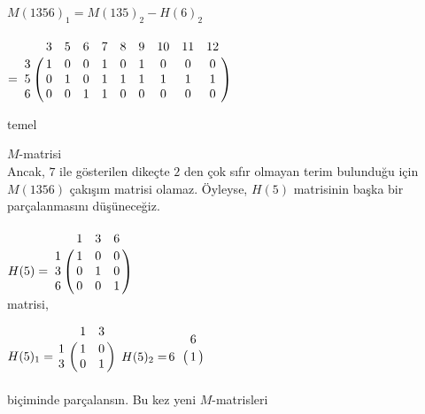 \documentclass{article}
\begin{document}
$M(1356)_{1} = M(135)_{2} - H(6)_{2}$  \\
\\

\hspace{15mm}
$ =  \bordermatrix {~ & 3 & 5 & 6 & 7 & 8 & 9 & 10 & 11 & 12  \cr 
                       3 & 1 & 0 & 0 & 1 & 0 & 1 & 0 & 0 & 0 \cr 
                       5 & 0 & 1 & 0 & 1 & 1 & 1 & 1 & 1 & 1 \cr
                       6 & 0 & 0 & 1 & 1 & 0 & 0 & 0 & 0 & 0}$
                       
\hspace{60mm} temel 

\hspace{60mm} $M$-matrisi \\

Ancak, $7$ ile gösterilen dikeçte $2$ den çok sıfır olmayan terim bulunduğu için $M(1356)$ çakışım matrisi olamaz. Öyleyse, $H(5)$ matrisinin başka bir parçalanmasını düşüneceğiz. \\
\\

\hspace{7mm}
$H(5) = \bordermatrix{~ & 1 & 3 & 6 \cr
                        1 & 1 & 0 & 0 \cr
                        3 & 0 & 1 & 0 \cr
                        6 & 0 & 0 & 1}$ \\
                        
matrisi,

\hspace{7mm}
$H(5)_{1} = \bordermatrix{~ & 1 & 3 \cr
                            1 & 1 & 0 \cr
                            3 & 0 & 1}$ \hspace{5mm}  $H(5)_{2} = \bordermatrix{~ & 6 \cr
                            6 & 1}$ \\
\\                           

biçiminde parçalansın. Bu kez yeni $M$-matrisleri 
\end{document}
